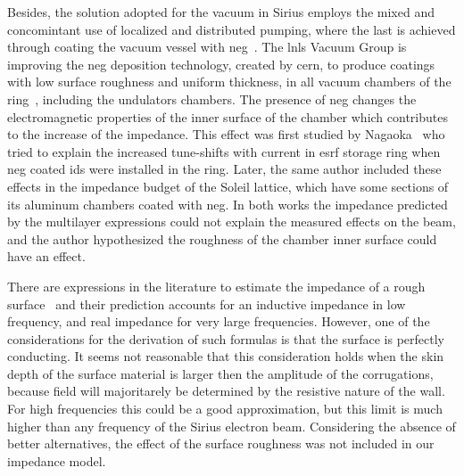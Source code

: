     Besides, the solution adopted for the vacuum in Sirius employs the mixed and concomintant use of localized and distributed pumping, where the last is achieved through coating the vacuum vessel with \gls{neg}~\cite{NEGrefs}. The \gls{lnls} Vacuum Group
    is improving the \gls{neg} deposition technology, created by \gls{cern}, to produce coatings
    with low surface roughness and uniform thickness, in all vacuum chambers of the ring~\cite{LNLSNEG}, including the undulators chambers. The presence of \gls{neg} changes the electromagnetic properties of the inner surface of the chamber which contributes to the increase of the impedance. This effect was first studied by Nagaoka~\cite{Nagaoka} who tried to explain the increased tune-shifts with current in \gls{esrf} storage ring when \gls{neg} coated \gls{ids} were installed in the ring. Later, the same author included these effects in the impedance budget of the Soleil lattice, which have some sections of its aluminum chambers coated with \gls{neg}. In both works the impedance predicted by the multilayer expressions could not explain the measured effects on the beam, and the author hypothesized the roughness of the chamber inner surface could have an effect.

    There are expressions in the literature to estimate the impedance of a rough surface~\cite{Stupakov_Surface} and their prediction accounts for an inductive impedance in low frequency, and real impedance for very large frequencies. However, one of the considerations for the derivation of such formulas is that the surface is perfectly conducting. It seems not reasonable that this consideration holds when the skin depth of the surface material is larger then the amplitude of the corrugations, because field will majoritarely be determined by the resistive nature of the wall. For high frequencies this could be a good approximation, but this limit is much higher than any frequency of the Sirius electron beam. Considering the absence of better alternatives, the effect of the surface roughness was not included in our impedance model.

